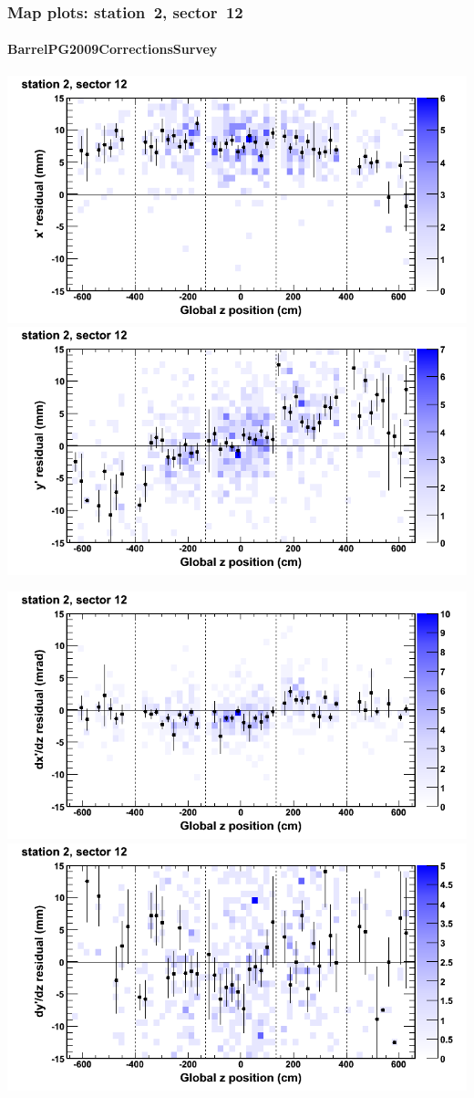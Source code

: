 \documentclass[compress]{beamer}
\begin{document}
\begin{frame}
\frametitle{Map plots: station~2, sector~12}
\framesubtitle{BarrelPG2009CorrectionsSurvey}
\includegraphics[width=0.5\linewidth]{mapplots_01/DTvsz_st2sec12_x.png}
\includegraphics[width=0.5\linewidth]{mapplots_01/DTvsz_st2sec12_y.png}

\includegraphics[width=0.5\linewidth]{mapplots_01/DTvsz_st2sec12_dxdz.png}
\includegraphics[width=0.5\linewidth]{mapplots_01/DTvsz_st2sec12_dydz.png}
\end{frame}
\end{document}
